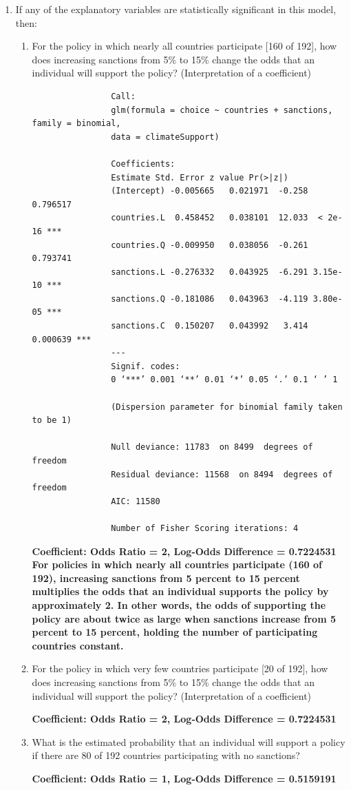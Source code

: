 \documentclass[12pt,letterpaper]{article}
\begin{document}
\begin{enumerate}
\begin{enumerate}
		

	\end{enumerate}
	
	\item
	If any of the explanatory variables are statistically significant in this model, then:
	\begin{enumerate}
		\item
		For the policy in which nearly all countries participate [160 of 192], how does increasing sanctions from 5\% to 15\% change the odds that an individual will support the policy? (Interpretation of a coefficient)
			 
			\vspace{10cm}
			\begin{verbatim}
				Call:
				glm(formula = choice ~ countries + sanctions, family = binomial,
				data = climateSupport)
				
				Coefficients:
				Estimate Std. Error z value Pr(>|z|)
				(Intercept) -0.005665   0.021971  -0.258 0.796517
				countries.L  0.458452   0.038101  12.033  < 2e-16 ***
				countries.Q -0.009950   0.038056  -0.261 0.793741
				sanctions.L -0.276332   0.043925  -6.291 3.15e-10 ***
				sanctions.Q -0.181086   0.043963  -4.119 3.80e-05 ***
				sanctions.C  0.150207   0.043992   3.414 0.000639 ***
				---
				Signif. codes:
				0 ‘***’ 0.001 ‘**’ 0.01 ‘*’ 0.05 ‘.’ 0.1 ‘ ’ 1
				
				(Dispersion parameter for binomial family taken to be 1)
				
				Null deviance: 11783  on 8499  degrees of freedom
				Residual deviance: 11568  on 8494  degrees of freedom
				AIC: 11580
				
				Number of Fisher Scoring iterations: 4
			\end{verbatim}
			\textbf{Coefficient:         Odds Ratio = 2, Log-Odds Difference  =
				0.7224531}
\textbf{For policies in which nearly all countries participate (160 of 192), increasing sanctions from 5 percent to 15 percent multiplies the odds that an individual supports the policy by approximately 2. In other words, the odds of supporting the policy are about twice as large when sanctions increase from 5 percent  to 15 percent,  holding the number of participating countries constant.}
			
		
		\item
		For the policy in which very few countries participate [20 of 192], how does increasing sanctions from 5\% to 15\% change the odds that an individual will support the policy? (Interpretation of a coefficient)
			 
			\textbf{Coefficient:         Odds Ratio = 2, Log-Odds Difference  =
				0.7224531}
		\item
		What is the estimated probability that an individual will support a policy if there are 80 of 192 countries participating with no sanctions? 
		 
		\textbf{Coefficient:         Odds Ratio = 1, Log-Odds Difference  = 0.5159191 }
	

\end{enumerate}
\end{enumerate}
\end{document}
